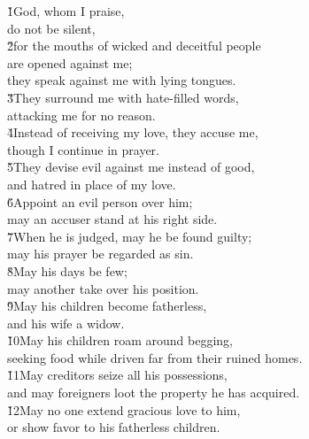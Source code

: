 \begin{poetry}
\poeml \v{1}God, whom I praise, \\
\poemll    do not be silent, \\
\poeml \v{2}for the mouths of wicked and deceitful people \\
\poemll    are opened against me; \\
\poemlll       they speak against me with lying tongues. \\
\poeml \v{3}They surround me with hate-filled words, \\
\poemll    attacking me for no reason. \\
\poeml \v{4}Instead of receiving my love, they accuse me, \\
\poemll    though I continue in prayer. \\
\poeml \v{5}They devise evil against me instead of good, \\
\poemll    and hatred in place of my love. \\
\poeml \v{6}Appoint an evil person over him; \\
\poemll    may an accuser stand at his right side. \\
\poeml \v{7}When he is judged, may he be found guilty; \\
\poemll    may his prayer be regarded as sin. \\
\poeml \v{8}May his days be few; \\
\poemll    may another take over his position. \\
\poeml \v{9}May his children become fatherless, \\
\poemll    and his wife a widow. \\
\poeml \v{10}May his children roam around begging, \\
\poemll    seeking food while driven far from their ruined homes. \\
\poeml \v{11}May creditors seize all his possessions, \\
\poemll    and may foreigners loot the property he has acquired. \\
\poeml \v{12}May no one extend gracious love to him, \\
\poemll    or show favor to his fatherless children. \\

\end{poetry}
